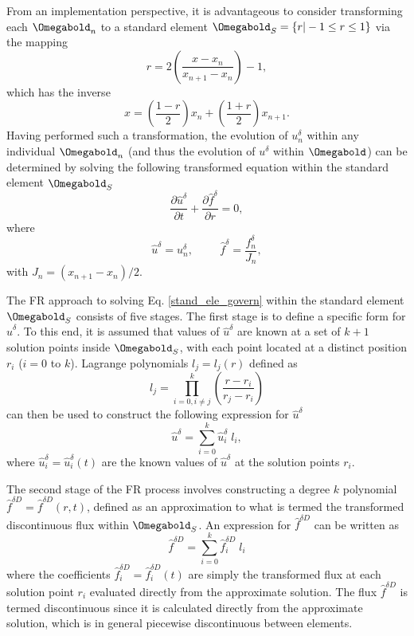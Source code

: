 From an implementation perspective, it is advantageous to consider transforming each $\Omegabold_n$ to a standard element $\Omegabold_S=\{r|-1\leq r\leq 1\}$ via the mapping
\begin{equation}
r=2\left(\frac{x-x_n}{x_{n+1}-x_n}\right)-1,
\end{equation}
which has the inverse
\begin{equation}
x=\left(\frac{1-r}{2}\right)x_n+\left(\frac{1+r}{2}\right)x_{n+1}.
\end{equation}
Having performed such a transformation, the evolution of $u_n^{\delta}$ within any individual $\Omegabold_n$ (and thus the evolution of $u^{\delta}$ within $\Omegabold$) can be determined by solving the following transformed equation within the standard element $\Omegabold_S$
\begin{equation}
\frac{\partial\hat{u}^{\delta}}{\partial t}+\frac{\partial\hat{f}^{\delta}}{\partial r}=0,
\label{stand_ele_govern}
\end{equation}
where
\begin{equation}
\hat{u}^{\delta}=u^{\delta}_n,\hspace{1cm}\hat{f}^{\delta}=\frac{f^{\delta}_n}{J_n},
\end{equation}
with $J_n=(x_{n+1}-x_{n})/2$.

The FR approach to solving Eq. \eqref{stand_ele_govern} within the standard element $\Omegabold_S$ consists of five stages. The first stage is to define a specific form for $\hat{u}^{\delta}$. To this end, it is assumed that values of $\hat{u}^{\delta}$ are known at a set of $k+1$ solution points inside $\Omegabold_S$, with each point located at a distinct position $r_i$ ($i=0$ to $k$). Lagrange polynomials $l_j=l_j(r)$ defined as
\begin{equation}
l_j=\prod_{i=0, i\neq j}^{k}\left(\frac{r-r_i}{r_j-r_i}\right)
\end{equation}
can then be used to construct the following expression for $\hat{u}^{\delta}$
\begin{equation}
\hat{u}^{\delta}=\sum_{i=0}^{k}\hat{u}^{\delta}_{i}\;l_i,
\label{trans_soln}
\end{equation}
where $\hat{u}^{\delta}_{i}=\hat{u}^{\delta}_{i}(t)$ are the known values of $\hat{u}^{\delta}$ at the solution points $r_i$.

The second stage of the FR process involves constructing a degree $k$ polynomial $\hat{f}^{\delta D}=\hat{f}^{\delta D}(r,t)$, defined as an approximation to what is termed the transformed discontinuous flux within $\Omegabold_S$. An expression for $\hat{f}^{\delta D}$ can be written as
\begin{equation}
\hat{f}^{\delta D}=\sum_{i=0}^{k}\hat{f}^{\delta D}_{i}\;l_i
\end{equation}
where the coefficients $\hat{f}^{\delta D}_{i}=\hat{f}^{\delta D}_{i}(t)$ are simply the transformed flux at each solution point $r_i$ evaluated directly from the approximate solution. The flux $\hat{f}^{\delta D}$ is termed discontinuous since it is calculated directly from the approximate solution, which is in general piecewise discontinuous between elements.

